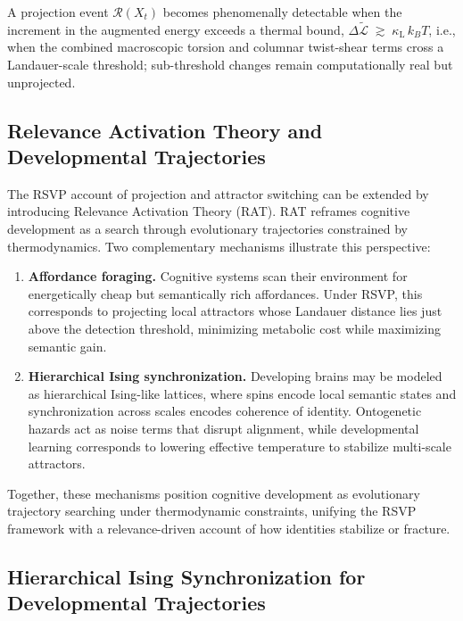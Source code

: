 \documentclass[a4paper,11pt]{article}
\begin{document}
\begin{remark}
A projection event $\mathcal{R}(X_t)$ becomes phenomenally detectable when the
increment in the augmented energy exceeds a thermal bound,
$\Delta \widetilde{\mathcal{L}} \;\gtrsim\; \kappa_{\mathrm{L}}\,k_B T$,
i.e., when the combined macroscopic torsion and columnar twist-shear terms
cross a Landauer-scale threshold; sub-threshold changes remain computationally
real but unprojected.
\end{remark}

\subsection{Relevance Activation Theory and Developmental Trajectories}

The RSVP account of projection and attractor switching can be extended by
introducing Relevance Activation Theory (RAT). RAT reframes cognitive
development as a search through evolutionary trajectories constrained by
thermodynamics. Two complementary mechanisms illustrate this perspective:

\begin{enumerate}
    \item \textbf{Affordance foraging.} Cognitive systems scan their
    environment for energetically cheap but semantically rich affordances.
    Under RSVP, this corresponds to projecting local attractors whose Landauer
    distance lies just above the detection threshold, minimizing metabolic cost
    while maximizing semantic gain.

    \item \textbf{Hierarchical Ising synchronization.} Developing brains may be
    modeled as hierarchical Ising-like lattices, where spins encode local
    semantic states and synchronization across scales encodes coherence of
    identity. Ontogenetic hazards act as noise terms that disrupt alignment,
    while developmental learning corresponds to lowering effective temperature
    to stabilize multi-scale attractors.
\end{enumerate}

Together, these mechanisms position cognitive development as evolutionary
trajectory searching under thermodynamic constraints, unifying the RSVP
framework with a relevance-driven account of how identities stabilize or
fracture.

\subsection{Hierarchical Ising Synchronization for Developmental Trajectories}
\label{sec:hierarchical-ising}
\end{document}

